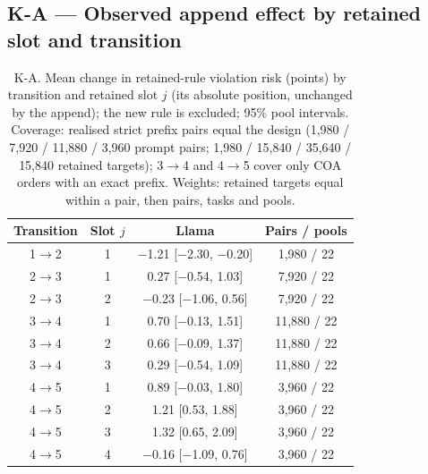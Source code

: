 \documentclass{article}
\begin{document}
\subsection*{K-A --- Observed append effect by retained slot and transition}
\begin{table}[h]
\centering\scriptsize
\caption{K-A. Mean change in retained-rule violation risk (points) by transition and retained slot $j$ (its absolute position, unchanged by the append); the new rule is excluded; 95\% pool intervals. Coverage: realised strict prefix pairs equal the design (1,980 / 7,920 / 11,880 / 3,960 prompt pairs; 1,980 / 15,840 / 35,640 / 15,840 retained targets); 3$\to$4 and 4$\to$5 cover only COA orders with an exact prefix. Weights: retained targets equal within a pair, then pairs, tasks and pools.}
\label{tab:KA}
\begin{tabular}{cccc}
\toprule
Transition & Slot $j$ & Llama & Pairs / pools \\
\midrule
1$\to$2 & 1 & $-$1.21 [$-$2.30, $-$0.20] & 1,980 / 22 \\
2$\to$3 & 1 & 0.27 [$-$0.54, 1.03] & 7,920 / 22 \\
2$\to$3 & 2 & $-$0.23 [$-$1.06, 0.56] & 7,920 / 22 \\
3$\to$4 & 1 & 0.70 [$-$0.13, 1.51] & 11,880 / 22 \\
3$\to$4 & 2 & 0.66 [$-$0.09, 1.37] & 11,880 / 22 \\
3$\to$4 & 3 & 0.29 [$-$0.54, 1.09] & 11,880 / 22 \\
4$\to$5 & 1 & 0.89 [$-$0.03, 1.80] & 3,960 / 22 \\
4$\to$5 & 2 & 1.21 [0.53, 1.88] & 3,960 / 22 \\
4$\to$5 & 3 & 1.32 [0.65, 2.09] & 3,960 / 22 \\
4$\to$5 & 4 & $-$0.16 [$-$1.09, 0.76] & 3,960 / 22 \\
\bottomrule
\end{tabular}
\end{table}
\end{document}
